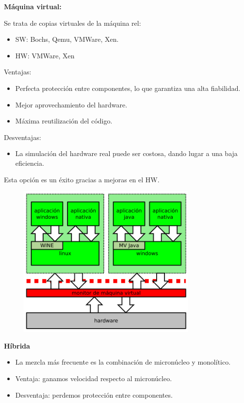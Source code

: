 \documentclass{article}
\begin{document}
\newpage

\textbf{Máquina virtual:}

Se trata de copias virtuales de la máquina rel:
\begin{itemize}
\item SW: Bochs, Qemu, VMWare, Xen.

\item HW: VMWare, Xen
\end{itemize}

Ventajas:
\begin{itemize}
\item Perfecta protección entre componentes, lo que garantiza una alta fiabilidad.

\item Mejor aprovechamiento del hardware.

\item Máxima reutilización del código.
\end{itemize}

Desventajas:
\begin{itemize}
\item La simulación del hardware real puede ser costosa, dando lugar a una baja eficiencia.
\end{itemize}

Esta opción es un éxito gracias a mejoras en el HW.

\begin{figure}[h]
\centering
\includegraphics[scale=1, width=90mm]{maquinavirtual.png}
\end{figure}

\newpage
\textbf{Híbrida}

\begin{itemize}
\item La mezcla más frecuente es la combinación de micronúcleo y monolítico.

\item Ventaja: ganamos velocidad respecto al micronúcleo.

\item Desventaja: perdemos protección entre componentes.
\end{itemize}
\end{document}
